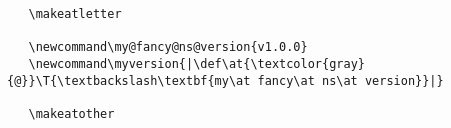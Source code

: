 \begin{frame}[fragile]
   \begin{lrbox}\CodeBox
   \begin{minipage}{.85\linewidth}
   \begin{verbatim}
   \makeatletter

   \newcommand\my@fancy@ns@version{v1.0.0}
   \newcommand\myversion{|\def\at{\textcolor{gray}{@}}\T{\textbackslash\textbf{my\at fancy\at ns\at version}}|}

   \makeatother
   \end{verbatim}
   \end{minipage}
   \end{lrbox}
   \begin{focus}
   \usebox\CodeBox
   \end{focus}
\end{frame}

\begin{frame}
   \begin{focus}
      \blatex{\\edef} \qquad\quad \blatex{\\expandafter} \quad\qquad \blatex{\\protect}\bigskip\\
   \end{focus}
\end{frame}

